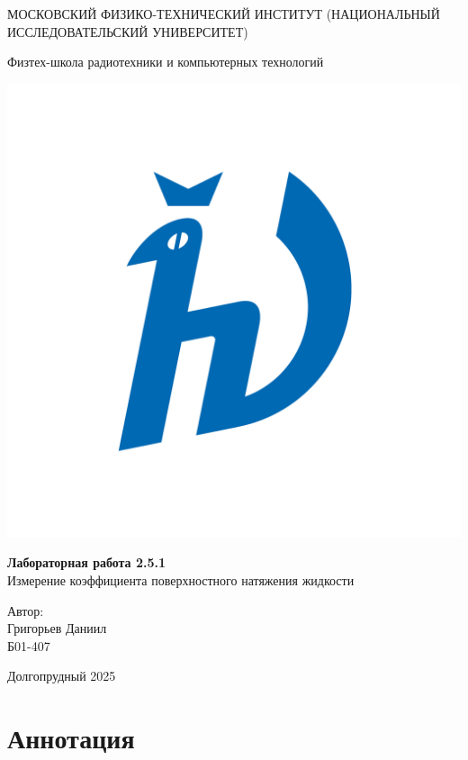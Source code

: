 \documentclass[12pt]{article}
\begin{document}
\begin{titlepage}
\begin{center}
    {\large МОСКОВСКИЙ ФИЗИКО-ТЕХНИЧЕСКИЙ ИНСТИТУТ (НАЦИОНАЛЬНЫЙ ИССЛЕДОВАТЕЛЬСКИЙ УНИВЕРСИТЕТ)}
\end{center}

\begin{center}
    {\large Физтех-школа радиотехники и компьютерных технологий}
\end{center}

\vspace{3.5cm}

\begin{center}
    \includegraphics[width=0.4\linewidth]{img/hv_full.png}
\end{center}

\vspace{0.05cm}

{\huge
\begin{center}
    {\bf Лабораторная работа 2.5.1}\\
    Измерение коэффициента поверхностного натяжения жидкости
\end{center}
}

\vspace{0.5cm}

\begin{flushright}
{\LARGE Автор:\\ Григорьев Даниил \\
\vspace{0.1cm}
Б01-407}
\end{flushright}

\vspace{0.5cm}
\begin{center}
    Долгопрудный 2025
\end{center}
\end{titlepage}

\section{Аннотация}
\end{document}
